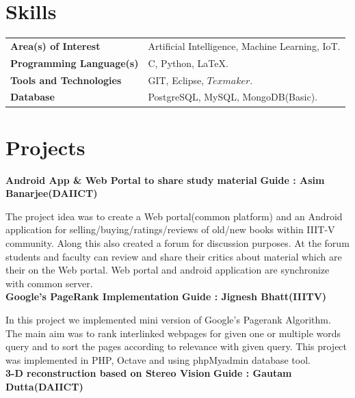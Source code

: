 \documentclass{article}
\begin{document}
\vspace*{.4cm}
\section{Skills}
\begin{tabular}{ll}
\textbf{Area(s) of Interest} & Artificial Intelligence, Machine Learning, IoT.\\
\textbf{Programming Language(s)}&C, Python, \LaTeX.\\
\textbf{Tools and Technologies} & GIT, Eclipse, $Texmaker$. \\
\textbf{Database} & PostgreSQL, MySQL, MongoDB(Basic).\\
\end{tabular}

\vspace*{.5cm}
\section{Projects}
\textbf{\large{Android App \& Web Portal to share study material}} \hspace*{2cm} \textbf{Guide : Asim Banarjee(DAIICT)}

\vspace*{.031mm}
\hspace*{2.6mm} The project idea was to create a Web portal(common platform) and an Android application for selling/buying/ratings/reviews of old/new books within IIIT-V community. Along this also created a forum for discussion purposes. At the forum students and faculty can review and share their critics about material which are their on the Web portal. Web portal and android application are synchronize with common server.\\

\textbf{\large{Google's PageRank Implementation}} \hspace*{6cm} \textbf{Guide : Jignesh Bhatt(IIITV)}

\vspace*{.031mm}
\hspace*{2.6mm} In this project we implemented mini version of Google's Pagerank Algorithm. The main aim was to rank interlinked webpages for given one or multiple words query and to sort the pages according to relevance with given query. This project was implemented in PHP, Octave and using phpMyadmin database tool.\\

\textbf{\large{3-D reconstruction based on Stereo Vision}} \hspace*{3.6cm} \textbf{Guide : Gautam Dutta(DAIICT)}
\end{document}
